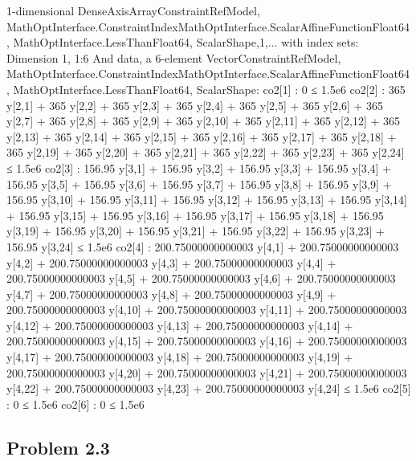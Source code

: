 \documentclass[12pt,a4paper]{article}
\begin{document}
1-dimensional DenseAxisArray{ConstraintRef{Model, MathOptInterface.ConstraintIndex{MathOptInterface.ScalarAffineFunction{Float64}, MathOptInterface.LessThan{Float64}}, ScalarShape},1,...} with index sets:
    Dimension 1, 1:6
And data, a 6-element Vector{ConstraintRef{Model, MathOptInterface.ConstraintIndex{MathOptInterface.ScalarAffineFunction{Float64}, MathOptInterface.LessThan{Float64}}, ScalarShape}}:
 co2[1] : 0 ≤ 1.5e6
 co2[2] : 365 y[2,1] + 365 y[2,2] + 365 y[2,3] + 365 y[2,4] + 365 y[2,5] + 365 y[2,6] + 365 y[2,7] + 365 y[2,8] + 365 y[2,9] + 365 y[2,10] + 365 y[2,11] + 365 y[2,12] + 365 y[2,13] + 365 y[2,14] + 365 y[2,15] + 365 y[2,16] + 365 y[2,17] + 365 y[2,18] + 365 y[2,19] + 365 y[2,20] + 365 y[2,21] + 365 y[2,22] + 365 y[2,23] + 365 y[2,24] ≤ 1.5e6
 co2[3] : 156.95 y[3,1] + 156.95 y[3,2] + 156.95 y[3,3] + 156.95 y[3,4] + 156.95 y[3,5] + 156.95 y[3,6] + 156.95 y[3,7] + 156.95 y[3,8] + 156.95 y[3,9] + 156.95 y[3,10] + 156.95 y[3,11] + 156.95 y[3,12] + 156.95 y[3,13] + 156.95 y[3,14] + 156.95 y[3,15] + 156.95 y[3,16] + 156.95 y[3,17] + 156.95 y[3,18] + 156.95 y[3,19] + 156.95 y[3,20] + 156.95 y[3,21] + 156.95 y[3,22] + 156.95 y[3,23] + 156.95 y[3,24] ≤ 1.5e6
 co2[4] : 200.75000000000003 y[4,1] + 200.75000000000003 y[4,2] + 200.75000000000003 y[4,3] + 200.75000000000003 y[4,4] + 200.75000000000003 y[4,5] + 200.75000000000003 y[4,6] + 200.75000000000003 y[4,7] + 200.75000000000003 y[4,8] + 200.75000000000003 y[4,9] + 200.75000000000003 y[4,10] + 200.75000000000003 y[4,11] + 200.75000000000003 y[4,12] + 200.75000000000003 y[4,13] + 200.75000000000003 y[4,14] + 200.75000000000003 y[4,15] + 200.75000000000003 y[4,16] + 200.75000000000003 y[4,17] + 200.75000000000003 y[4,18] + 200.75000000000003 y[4,19] + 200.75000000000003 y[4,20] + 200.75000000000003 y[4,21] + 200.75000000000003 y[4,22] + 200.75000000000003 y[4,23] + 200.75000000000003 y[4,24] ≤ 1.5e6
 co2[5] : 0 ≤ 1.5e6
 co2[6] : 0 ≤ 1.5e6


\subsection{Problem 2.3}
\end{document}

